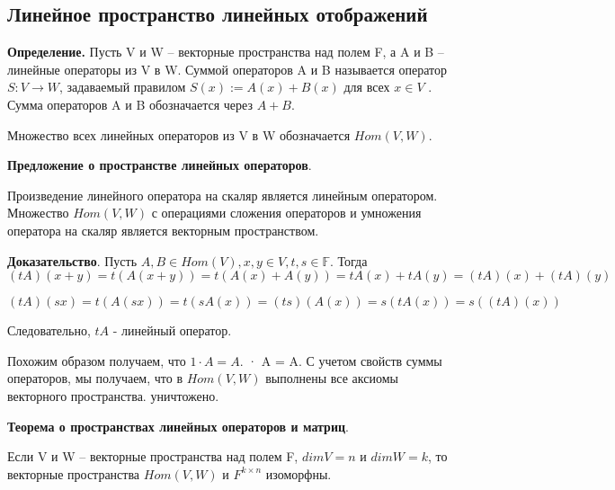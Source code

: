 \documentclass[a4paper]{article}
\begin{document}
    \subsection*{Линейное пространство линейных отображений}
    \textbf{Определение.} Пусть V и W – векторные пространства над полем F, а A и B – линейные операторы из V в W. Суммой операторов A и B называется оператор $S : V \rightarrow W$, задаваемый правилом $S(x) := A(x) + B(x)$ для всех $x \in V$ .
    Сумма операторов A и B обозначается через $A + B$.

    Множество всех линейных операторов из V в W обозначается $Hom(V, W)$.

    \begin{htheorem}
        \textbf{Предложение о пространстве линейных операторов}.

        Произведение линейного оператора на скаляр является линейным
        оператором. Множество $Hom(V, W)$ с операциями сложения операторов
        и умножения оператора на скаляр является векторным пространством.
    \end{htheorem}


    \begin{hproof}
        \textbf{Доказательство}. Пусть $A,B \in Hom(V), x,y \in V, t, s \in \mathbb{F}$. Тогда
        \begin{equation}
        (tA)(x+y)
            = t(A(x+y)) = t(A(x) + A(y)) = tA(x) + tA(y) = (tA)(x) + (tA)(y)
        \end{equation}

        \begin{equation}
        (tA)(sx)
            = t(A(sx)) = t(sA(x)) = (ts)(A(x)) = s(tA(x)) = s((tA)(x))
        \end{equation}

        Следовательно, $tA$ - линейный оператор.

        Похожим образом получаем, что $1 \cdot A = A$. · A = A. С учетом свойств суммы операторов, мы получаем,
        что в $Hom(V, W)$ выполнены все аксиомы векторного пространства. уничтожено.
    \end{hproof}

    \begin{htheorem}
        \textbf{Теорема о пространствах линейных операторов и матриц}.

        Если V и W – векторные пространства над полем F, $dim V = n$ и
        $dim W = k$, то векторные пространства $Hom(V,W)$ и $F^{k\times n}$ изоморфны.
    \end{htheorem}
\end{document}
